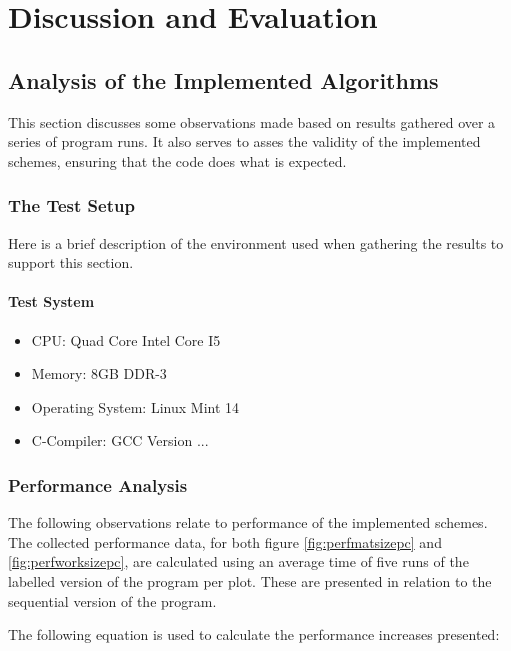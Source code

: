 \chapter{Discussion and Evaluation}
\section{Analysis of the Implemented Algorithms}
\label{sec:analysis}

This section discusses some observations made based on results gathered over a series of program runs.
It also serves to asses the validity of the implemented schemes, ensuring that the code does what is expected.

\subsection{The Test Setup}

Here is a brief description of the environment used when gathering the results to support this section.

\subsubsection*{Test System}
\begin{itemize}
\item CPU: Quad Core Intel Core I5
\item Memory: 8GB DDR-3
\item Operating System: Linux Mint 14
\item C-Compiler: GCC Version ...
\end{itemize}

\subsection{Performance Analysis}

The following observations relate to performance of the implemented schemes.
The collected performance data, for both figure \ref{fig:perfmatsizepc} and \ref{fig:perfworksizepc},
are calculated using an average time of five runs of the labelled version of the program per plot.
These are presented in relation to the sequential version of the program. 

The following equation is used to calculate the performance increases presented:

